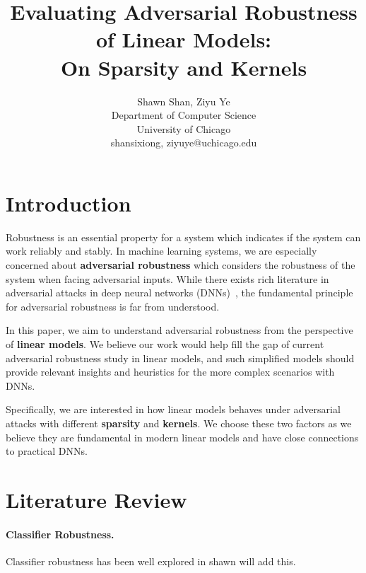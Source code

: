 \documentclass{article}
\title{Evaluating Adversarial Robustness of Linear Models:\\On Sparsity and Kernels}
\author{%
  Shawn Shan, Ziyu Ye \\
  Department of Computer Science\\
  University of Chicago\\
  {shansixiong, ziyuye}@uchicago.edu \\
}
\newcommand{\fixme}[1]{{\color{red} #1}}
\begin{document}
\maketitle


\section{Introduction}
Robustness is an essential property for a system which indicates if the system can work reliably and stably. In machine learning systems, we are especially concerned about \textbf{adversarial robustness} which considers the robustness of the system when facing adversarial inputs. While there exists rich literature in adversarial attacks in deep neural networks (DNNs)~\cite{hao2020adversarial}, the fundamental principle for adversarial robustness is far from understood.

In this paper, we aim to understand adversarial robustness from the perspective of \textbf{linear models}. We believe our work would help fill the gap of current adversarial robustness study in linear models, and such simplified models should provide relevant insights and heuristics for the more complex scenarios with DNNs.

Specifically, we are interested in how linear models behaves under adversarial attacks with different \textbf{sparsity} and \textbf{kernels}. We choose these two factors as we believe they are fundamental in modern linear models and have close connections to practical DNNs.


\section{Literature Review}
\paragraph{Classifier Robustness.} Classifier robustness has been well explored in \fixme{shawn will add this.}
\end{document}
